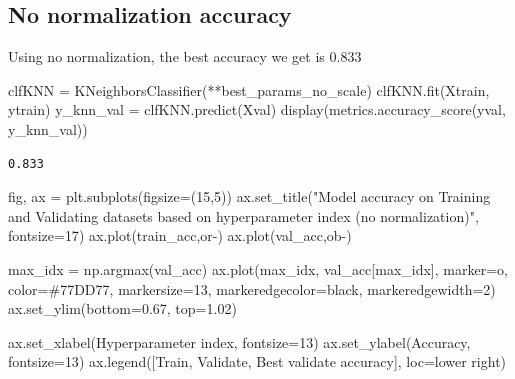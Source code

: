 \documentclass[
  letterpaper,
  DIV=11,
  numbers=noendperiod]{scrartcl}
\newenvironment{Shaded}{\begin{snugshade}}{\end{snugshade}}
\newcommand{\DecValTok}[1]{\textcolor[rgb]{0.68,0.00,0.00}{#1}}
\newcommand{\FloatTok}[1]{\textcolor[rgb]{0.68,0.00,0.00}{#1}}
\newcommand{\NormalTok}[1]{\textcolor[rgb]{0.00,0.23,0.31}{#1}}
\newcommand{\OperatorTok}[1]{\textcolor[rgb]{0.37,0.37,0.37}{#1}}
\newcommand{\StringTok}[1]{\textcolor[rgb]{0.13,0.47,0.30}{#1}}
\begin{document}
\subsection{No normalization accuracy}\label{no-normalization-accuracy}

Using no normalization, the best accuracy we get is 0.833

\begin{Shaded}
\begin{Highlighting}[]
\NormalTok{clfKNN }\OperatorTok{=}\NormalTok{ KNeighborsClassifier(}\OperatorTok{**}\NormalTok{best\_params\_no\_scale)}
\NormalTok{clfKNN.fit(Xtrain, ytrain)}
\NormalTok{y\_knn\_val }\OperatorTok{=}\NormalTok{ clfKNN.predict(Xval)}
\NormalTok{display(metrics.accuracy\_score(yval, y\_knn\_val))}
\end{Highlighting}
\end{Shaded}

\begin{verbatim}
0.833
\end{verbatim}

\begin{Shaded}
\begin{Highlighting}[]
\NormalTok{fig, ax }\OperatorTok{=}\NormalTok{ plt.subplots(figsize}\OperatorTok{=}\NormalTok{(}\DecValTok{15}\NormalTok{,}\DecValTok{5}\NormalTok{))}
\NormalTok{ax.set\_title(}\StringTok{"Model accuracy on Training and Validating datasets based on hyperparameter index (no normalization)"}\NormalTok{, fontsize}\OperatorTok{=}\DecValTok{17}\NormalTok{)}
\NormalTok{ax.plot(train\_acc,}\StringTok{\textquotesingle{}or{-}\textquotesingle{}}\NormalTok{)}
\NormalTok{ax.plot(val\_acc,}\StringTok{\textquotesingle{}ob{-}\textquotesingle{}}\NormalTok{)}


\NormalTok{max\_idx }\OperatorTok{=}\NormalTok{ np.argmax(val\_acc)}
\NormalTok{ax.plot(max\_idx, val\_acc[max\_idx], marker}\OperatorTok{=}\StringTok{\textquotesingle{}o\textquotesingle{}}\NormalTok{, color}\OperatorTok{=}\StringTok{\textquotesingle{}\#77DD77\textquotesingle{}}\NormalTok{, markersize}\OperatorTok{=}\DecValTok{13}\NormalTok{, markeredgecolor}\OperatorTok{=}\StringTok{\textquotesingle{}black\textquotesingle{}}\NormalTok{, markeredgewidth}\OperatorTok{=}\DecValTok{2}\NormalTok{)}
\NormalTok{ax.set\_ylim(bottom}\OperatorTok{=}\FloatTok{0.67}\NormalTok{, top}\OperatorTok{=}\FloatTok{1.02}\NormalTok{)}

\NormalTok{ax.set\_xlabel(}\StringTok{\textquotesingle{}Hyperparameter index\textquotesingle{}}\NormalTok{, fontsize}\OperatorTok{=}\DecValTok{13}\NormalTok{)}
\NormalTok{ax.set\_ylabel(}\StringTok{\textquotesingle{}Accuracy\textquotesingle{}}\NormalTok{, fontsize}\OperatorTok{=}\DecValTok{13}\NormalTok{)}
\NormalTok{ax.legend([}\StringTok{\textquotesingle{}Train\textquotesingle{}}\NormalTok{, }\StringTok{\textquotesingle{}Validate\textquotesingle{}}\NormalTok{, }\StringTok{\textquotesingle{}Best validate accuracy\textquotesingle{}}\NormalTok{], loc}\OperatorTok{=}\StringTok{\textquotesingle{}lower right\textquotesingle{}}\NormalTok{)}
\end{Highlighting}
\end{Shaded}
\end{document}
